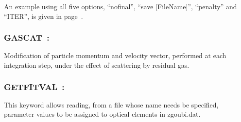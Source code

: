 \medskip

\noindent An example using all five options, ``nofinal'', ``save [FileName]'', ``penalty'' and ``ITER'', 
is given in page~\pageref{FITOptionsExa}. 








\newpage

\subsubsection*{GASCAT~: \GASCATTitl} \label{GASCAT}
\medskip

Modification of particle momentum and velocity vector, performed at each integration step, 
under the effect of scattering by residual gas.

\bigskip




\newpage

\subsubsection*{GETFITVAL~: \GETFITVALTitl} \label{GETFITVAL}  
\medskip

This keyword allows reading, 
from a file whose name needs be specified,  parameter values to be assigned to optical elements in zgoubi.dat. 

\bigskip

